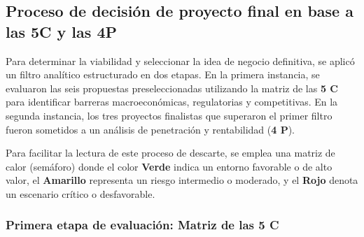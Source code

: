 \subsection{Proceso de decisión de proyecto final en base a las 5C y las 4P}

Para determinar la viabilidad y seleccionar la idea de negocio definitiva, se aplicó un filtro analítico estructurado en dos etapas. En la primera instancia, se evaluaron las seis propuestas preseleccionadas utilizando la matriz de las \textbf{5 C} para identificar barreras macroeconómicas, regulatorias y competitivas. En la segunda instancia, los tres proyectos finalistas que superaron el primer filtro fueron sometidos a un análisis de penetración y rentabilidad (\textbf{4 P}).

Para facilitar la lectura de este proceso de descarte, se emplea una matriz de calor (semáforo) donde el color \textbf{\colorbox{green!50}{Verde}} indica un entorno favorable o de alto valor, el \textbf{\colorbox{yellow!50}{Amarillo}} representa un riesgo intermedio o moderado, y el \textbf{\colorbox{red!50}{Rojo}} denota un escenario crítico o desfavorable.

\subsubsection*{Primera etapa de evaluación: Matriz de las 5 C}

